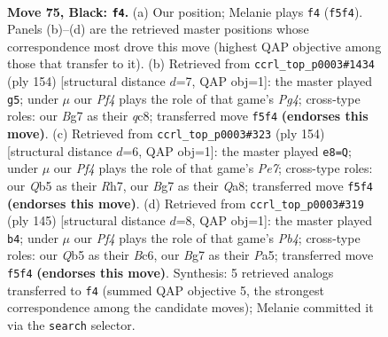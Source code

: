 \documentclass[11pt]{article}
\begin{document}
\clearpage

\begin{figure}[p]\centering
\begin{subfigure}{0.46\textwidth}\centering
\resizebox{\linewidth}{!}{%
\newchessgame
\chessboard[
  setfen={8/2k3b1/8/1q3p2/7K/8/8/8 b - - 1 75},
  showmover=false,
  pgfstyle=straightmove, color=movearrow, markmove={f5-f4}
]}
\caption{}
\end{subfigure}\hfill
\begin{subfigure}{0.46\textwidth}\centering
\resizebox{\linewidth}{!}{%
\newchessgame
\chessboard[
  setfen={2q5/8/6K1/1k6/3Q2P1/8/8/8 w - - 1 78},
  showmover=false,
  pgfstyle=straightmove, color=movearrow, markmove={g4-g5}
]}
\caption{}
\end{subfigure}
\\[4pt]
\begin{subfigure}{0.46\textwidth}\centering
\resizebox{\linewidth}{!}{%
\newchessgame
\chessboard[
  setfen={Q7/4P2R/8/5K2/8/3k4/8/8 w - - 1 78},
  showmover=false,
  pgfstyle=straightmove, color=movearrow, markmove={e7-e8}
]}
\caption{}
\end{subfigure}\hfill
\begin{subfigure}{0.46\textwidth}\centering
\resizebox{\linewidth}{!}{%
\newchessgame
\chessboard[
  setfen={8/5k2/2b5/pp6/3K4/8/8/1N6 b - - 1 73},
  showmover=false,
  pgfstyle=straightmove, color=movearrow, markmove={b5-b4}
]}
\caption{}
\end{subfigure}
\caption{\textbf{Move 75, Black: \texttt{f4}.} (a) Our position; Melanie plays \texttt{f4} (\texttt{f5f4}). Panels (b)--(d) are the retrieved master positions whose correspondence most drove this move (highest QAP objective among those that transfer to it). (b) Retrieved from \texttt{ccrl\_top\_p0003\#1434} (ply 154) [structural distance $d$=7, QAP obj=1]: the master played \texttt{g5}; under $\mu$ our \emph{Pf4} plays the role of that game's \emph{Pg4}; cross-type roles: our \emph{B}g7 as their \emph{q}c8; transferred move \texttt{f5f4} \textbf{(endorses this move)}. (c) Retrieved from \texttt{ccrl\_top\_p0003\#323} (ply 154) [structural distance $d$=6, QAP obj=1]: the master played \texttt{e8=Q}; under $\mu$ our \emph{Pf4} plays the role of that game's \emph{Pe7}; cross-type roles: our \emph{Q}b5 as their \emph{R}h7, our \emph{B}g7 as their \emph{Q}a8; transferred move \texttt{f5f4} \textbf{(endorses this move)}. (d) Retrieved from \texttt{ccrl\_top\_p0003\#319} (ply 145) [structural distance $d$=8, QAP obj=1]: the master played \texttt{b4}; under $\mu$ our \emph{Pf4} plays the role of that game's \emph{Pb4}; cross-type roles: our \emph{Q}b5 as their \emph{B}c6, our \emph{B}g7 as their \emph{P}a5; transferred move \texttt{f5f4} \textbf{(endorses this move)}. Synthesis: 5 retrieved analogs transferred to \texttt{f4} (summed QAP objective 5, the strongest correspondence among the candidate moves); Melanie committed it via the \texttt{search} selector.}
\label{fig:thought-m149}
\end{figure}
\end{document}
